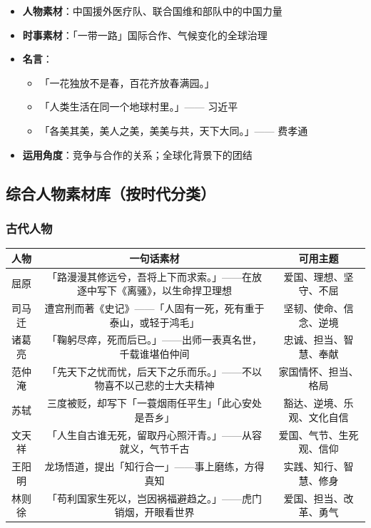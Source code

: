 \begin{itemize}
  \item \textbf{人物素材}：中国援外医疗队、联合国维和部队中的中国力量
  \item \textbf{时事素材}：「一带一路」国际合作、气候变化的全球治理
  \item \textbf{名言}：
    \begin{itemize}
      \item 「一花独放不是春，百花齐放春满园。」
      \item 「人类生活在同一个地球村里。」—— 习近平
      \item 「各美其美，美人之美，美美与共，天下大同。」—— 费孝通
    \end{itemize}
  \item \textbf{运用角度}：竞争与合作的关系；全球化背景下的团结
\end{itemize}

\subsection{综合人物素材库（按时代分类）}

\subsubsection{古代人物}

\begin{center}
\begin{tabular}{c|c|c}
\textbf{人物} & \textbf{一句话素材} & \textbf{可用主题} \\ \hline
屈原 & 「路漫漫其修远兮，吾将上下而求索。」——在放逐中写下《离骚》，以生命捍卫理想 & 爱国、理想、坚守、不屈 \\
司马迁 & 遭宫刑而著《史记》——「人固有一死，死有重于泰山，或轻于鸿毛」 & 坚韧、使命、信念、逆境 \\
诸葛亮 & 「鞠躬尽瘁，死而后已。」——出师一表真名世，千载谁堪伯仲间 & 忠诚、担当、智慧、奉献 \\
范仲淹 & 「先天下之忧而忧，后天下之乐而乐。」——不以物喜不以己悲的士大夫精神 & 家国情怀、担当、格局 \\
苏轼 & 三度被贬，却写下「一蓑烟雨任平生」「此心安处是吾乡」 & 豁达、逆境、乐观、文化自信 \\
文天祥 & 「人生自古谁无死，留取丹心照汗青。」——从容就义，气节千古 & 爱国、气节、生死观、信仰 \\
王阳明 & 龙场悟道，提出「知行合一」——事上磨练，方得真知 & 实践、知行、智慧、修身 \\
林则徐 & 「苟利国家生死以，岂因祸福避趋之。」——虎门销烟，开眼看世界 & 爱国、担当、改革、勇气 \\
\end{tabular}
\end{center}

